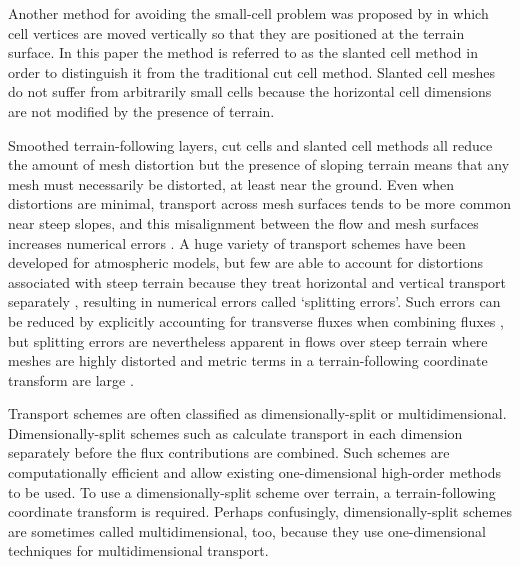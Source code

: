 Another method for avoiding the small-cell problem was proposed by \citep{shaw-weller2016} in which cell vertices are moved vertically so that they are positioned at the terrain surface.  In this paper the method is referred to as the slanted cell method in order to distinguish it from the traditional cut cell method.  Slanted cell meshes do not suffer from arbitrarily small cells because the horizontal cell dimensions are not modified by the presence of terrain.

Smoothed terrain-following layers, cut cells and slanted cell methods all reduce the amount of mesh distortion but the presence of sloping terrain means that any mesh must necessarily be distorted, at least near the ground.
Even when distortions are minimal, transport across mesh surfaces tends to be more common near steep slopes, and this misalignment between the flow and mesh surfaces increases numerical errors \citep{leonard1993,schaer2002,shaw-weller2016}.
A huge variety of transport schemes have been developed for atmospheric models, but few are able to account for distortions associated with steep terrain because they treat horizontal and vertical transport separately , resulting in numerical errors called `splitting errors'.
Such errors can be reduced by explicitly accounting for transverse fluxes when combining fluxes \citep{leonard1996}, but splitting errors are nevertheless apparent in flows over steep terrain where meshes are highly distorted and metric terms in a terrain-following coordinate transform are large \citep{weller2017}.

Transport schemes are often classified as dimensionally-split or multidimensional.
Dimensionally-split schemes such as \citep{lin-rood1996,katta2015} calculate transport in each dimension separately before the flux contributions are combined.  Such schemes are computationally efficient and allow existing one-dimensional high-order methods to be used.  To use a dimensionally-split scheme over terrain, a terrain-following coordinate transform is required.
Perhaps confusingly, dimensionally-split schemes are sometimes called multidimensional, too, because they use one-dimensional techniques for multidimensional transport.

